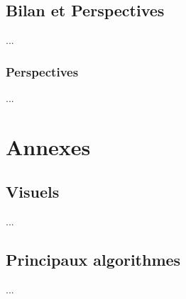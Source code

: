 \documentclass[twoside]{report}
\begin{document}
\chapter{Bilan et Perspectives} %
...

\section*{Perspectives}
...

\part*{Annexes}

\begin{appendix}
\chapter{Visuels}
\label{visuels}
...

\chapter{Principaux algorithmes}
...
\end{appendix}
\end{document}
